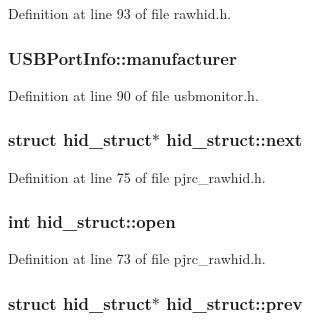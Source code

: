 \-Definition at line 93 of file rawhid.\-h.

\hypertarget{group___raw_h_i_d_plugin_ga2ab42268838049538e60aa4a7aa3d305}{
\subsubsection[{manufacturer}]{ {\bf \-U\-S\-B\-Port\-Info\-::manufacturer}}}\label{group___raw_h_i_d_plugin_ga2ab42268838049538e60aa4a7aa3d305}


\-Definition at line 90 of file usbmonitor.\-h.

\hypertarget{group___raw_h_i_d_plugin_gafe069ce715c9b005340052f4ea9f1a62}{
\subsubsection[{next}]{\setlength{\rightskip}{0pt plus 5cm}struct {\bf hid\-\_\-struct}$\ast$ {\bf hid\-\_\-struct\-::next}}}\label{group___raw_h_i_d_plugin_gafe069ce715c9b005340052f4ea9f1a62}


\-Definition at line 75 of file pjrc\-\_\-rawhid.\-h.

\hypertarget{group___raw_h_i_d_plugin_gac3065ab2f0080eb3fe182cad3fff15ee}{
\subsubsection[{open}]{\setlength{\rightskip}{0pt plus 5cm}int {\bf hid\-\_\-struct\-::open}}}\label{group___raw_h_i_d_plugin_gac3065ab2f0080eb3fe182cad3fff15ee}


\-Definition at line 73 of file pjrc\-\_\-rawhid.\-h.

\hypertarget{group___raw_h_i_d_plugin_gac0d9fa3480e665ae9aca8a621a1dc66d}{
\subsubsection[{prev}]{\setlength{\rightskip}{0pt plus 5cm}struct {\bf hid\-\_\-struct}$\ast$ {\bf hid\-\_\-struct\-::prev}}}\label{group___raw_h_i_d_plugin_gac0d9fa3480e665ae9aca8a621a1dc66d}


